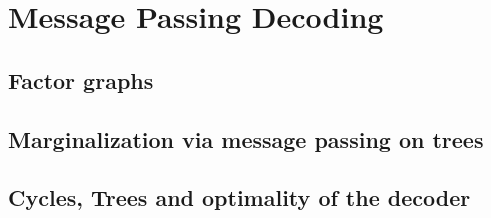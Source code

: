 \chapter{Message Passing Decoding}

\section{Factor graphs}

\section{Marginalization via message passing on trees}

\section{Cycles, Trees and optimality of the decoder}